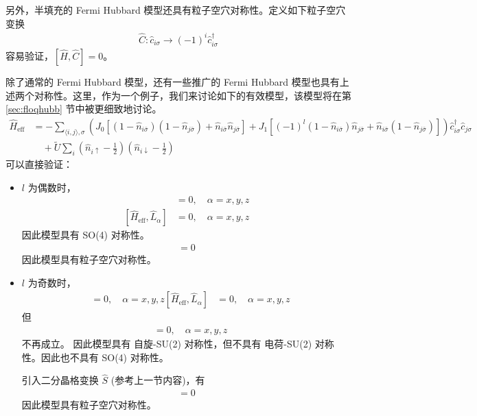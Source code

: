 另外，半填充的 Fermi Hubbard 模型还具有粒子空穴对称性。定义如下粒子空穴变换
\begin{align}
\hat{C}: \hat{c}_{i\sigma} \rightarrow (-1)^i\hat{c}_{i\sigma}^{\dagger}
\end{align}
容易验证，$[\hat{H}, \hat{C}]=0$。



除了通常的 Fermi Hubbard 模型，还有一些推广的 Fermi Hubbard 模型也具有上述两个对称性。这里，作为一个例子，我们来讨论如下的有效模型，该模型将在第 \ref{sec:floqhubb} 节中被更细致地讨论。
\begin{align}
\hat{H}_{\text{eff}} &= - \sum_{\langle i,j\rangle, \sigma} 
\left(J_0[(1-\hat{n}_{i\bar\sigma})(1-\hat{n}_{j\bar\sigma}) + \hat{n}_{i\bar\sigma}\hat{n}_{j\bar\sigma}]
+J_1[(-1)^l(1-\hat{n}_{i\bar\sigma})\hat{n}_{j\bar\sigma} + \hat{n}_{i\bar\sigma}(1-\hat{n}_{j\bar\sigma})]\right)
\hat{c}_{i\sigma}^{\dagger}\hat{c}_{j\sigma} \nonumber\\
& \quad + \tilde{U}\sum_{i}\left(\hat{n}_{i\uparrow}-\frac{1}{2}\right)\left(\hat{n}_{i\downarrow}-\frac{1}{2}\right)
\end{align}
可以直接验证：

\begin{itemize}

\item $l$ 为偶数时，
\begin{align}
[\hat{H}_{\text{eff}}, \hat{S}_{\alpha}] &= 0, \quad \alpha=x,y,z \\
[\hat{H}_{\text{eff}}, \hat{L}_{\alpha}] &= 0, \quad \alpha=x,y,z 
\end{align}
因此模型具有 SO(4) 对称性。
\begin{align}
[\hat{H}_{\text{eff}}, \hat{C}]=0
\end{align}
因此模型具有粒子空穴对称性。

\item $l$ 为奇数时，
\begin{align}
[\hat{H}_{\text{eff}}, \hat{S}_{\alpha}] &= 0, \quad \alpha=x,y,z
[\hat{H}_{\text{eff}}, \hat{L}_{\alpha}] &= 0, \quad \alpha=x,y,z 
\end{align}
但
\begin{align}
[\hat{H}_{\text{eff}}, \hat{L}_{\alpha}] &= 0, \quad \alpha=x,y,z 
\end{align}
不再成立。
因此模型具有 自旋-SU(2) 对称性，但不具有 电荷-SU(2) 对称性。因此也不具有 SO(4) 对称性。

引入二分晶格变换 $\hat{S}$ (参考上一节内容)，有
\begin{align}
[\hat{H}_{\text{eff}}, \hat{C}\hat{S}]=0
\end{align}
因此模型具有粒子空穴对称性。

\end{itemize}



